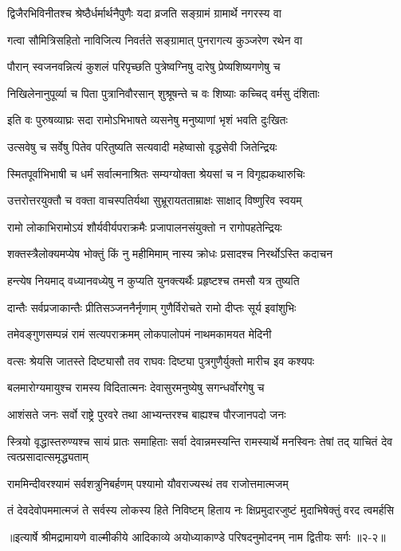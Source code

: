 \twolineshloka
{द्विजैरभिविनीतश्च श्रेष्ठैर्धर्मार्थनैपुणैः}
{यदा व्रजति सङ्ग्रामं ग्रामार्थे नगरस्य वा} %

\twolineshloka
{गत्वा सौमित्रिसहितो नाविजित्य निवर्तते}
{सङ्ग्रामात् पुनरागत्य कुञ्जरेण रथेन वा} %

\twolineshloka
{पौरान् स्वजनवन्नित्यं कुशलं परिपृच्छति}
{पुत्रेष्वग्निषु दारेषु प्रेष्यशिष्यगणेषु च} %

\twolineshloka
{निखिलेनानुपूर्व्या च पिता पुत्रानिवौरसान्}
{शुश्रूषन्ते च वः शिष्याः कच्चिद् वर्मसु दंशिताः} %

\twolineshloka
{इति वः पुरुषव्याघ्रः सदा रामोऽभिभाषते}
{व्यसनेषु मनुष्याणां भृशं भवति दुःखितः} %

\twolineshloka
{उत्सवेषु च सर्वेषु पितेव परितुष्यति}
{सत्यवादी महेष्वासो वृद्धसेवी जितेन्द्रियः} %

\twolineshloka
{स्मितपूर्वाभिभाषी च धर्मं सर्वात्मनाश्रितः}
{सम्यग्योक्ता श्रेयसां च न विगृह्यकथारुचिः} %

\twolineshloka
{उत्तरोत्तरयुक्तौ च वक्ता वाचस्पतिर्यथा}
{सुभ्रूरायतताम्राक्षः साक्षाद् विष्णुरिव स्वयम्} %

\twolineshloka
{रामो लोकाभिरामोऽयं शौर्यवीर्यपराक्रमैः}
{प्रजापालनसंयुक्तो न रागोपहतेन्द्रियः} %

\twolineshloka
{शक्तस्त्रैलोक्यमप्येष भोक्तुं किं नु महीमिमाम्}
{नास्य क्रोधः प्रसादश्च निरर्थोऽस्ति कदाचन} %

\twolineshloka
{हन्त्येष नियमाद् वध्यानवध्येषु न कुप्यति}
{युनक्त्यर्थैः प्रहृष्टश्च तमसौ यत्र तुष्यति} %

\twolineshloka
{दान्तैः सर्वप्रजाकान्तैः प्रीतिसञ्जननैर्नृणाम्}
{गुणैर्विरोचते रामो दीप्तः सूर्य इवांशुभिः} %

\twolineshloka
{तमेवङ्गुणसम्पन्नं रामं सत्यपराक्रमम्}
{लोकपालोपमं नाथमकामयत मेदिनी} %

\twolineshloka
{वत्सः श्रेयसि जातस्ते दिष्ट्यासौ तव राघवः}
{दिष्ट्या पुत्रगुणैर्युक्तो मारीच इव कश्यपः} %

\twolineshloka
{बलमारोग्यमायुश्च रामस्य विदितात्मनः}
{देवासुरमनुष्येषु सगन्धर्वोरगेषु च} %

\twolineshloka
{आशंसते जनः सर्वो राष्ट्रे पुरवरे तथा}
{आभ्यन्तरश्च बाह्यश्च पौरजानपदो जनः} %

\threelineshloka
{स्त्रियो वृद्धास्तरुण्यश्च सायं प्रातः समाहिताः}
{सर्वा देवान्नमस्यन्ति रामस्यार्थे मनस्विनः}
{तेषां तद् याचितं देव त्वत्प्रसादात्समृद्ध्यताम्} %

\twolineshloka
{राममिन्दीवरश्यामं सर्वशत्रुनिबर्हणम्}
{पश्यामो यौवराज्यस्थं तव राजोत्तमात्मजम्} %

\twolineshloka
{तं देवदेवोपममात्मजं ते सर्वस्य लोकस्य हिते निविष्टम्}
{हिताय नः क्षिप्रमुदारजुष्टं मुदाभिषेक्तुं वरद त्वमर्हसि} %


॥इत्यार्षे श्रीमद्रामायणे वाल्मीकीये आदिकाव्ये अयोध्याकाण्डे परिषदनुमोदनम् नाम द्वितीयः सर्गः ॥२-२॥

